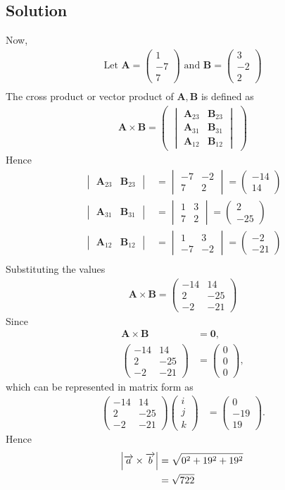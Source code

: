 \documentclass[12pt]{article}
\newcommand{\mydet}[1]{\ensuremath{\begin{vmatrix}#1\end{vmatrix}}}
\newcommand{\myvec}[1]{\ensuremath{\begin{pmatrix}#1\end{pmatrix}}}
\let\vec\mathbf
\begin{document}
\begin{enumerate}
\section{Solution}
Now,
\begin{align}
\text{Let } \vec{A} = \myvec{1\\-7\\7} \text{ and } \vec{B} = \myvec{3\\ -2 \\ 2}\\
\end{align}
The cross product or vector product of $\vec{A},\vec{B}$ is defined as
\begin{align}
	\vec{A} \times \vec{B} = \myvec{\mydet{\vec{A}_{23}&\vec{B}_{23}\\\vec{A}_{31}&\vec{B}_{31}\\\vec{A}_{12}&\vec{B}_{12}}}
\end{align}
Hence
\begin{align}
	\mydet{\vec{A}_{23}&\vec{B}_{23}}&=\mydet{-7&-2\\7&2}=\myvec{-14\\14}\\
	\mydet{\vec{A}_{31}&\vec{B}_{31}}&=\mydet{1&3\\7&2}=\myvec{2\\-25}\\
	\mydet{\vec{A}_{12}&\vec{B}_{12}}&=\mydet{1&3\\-7&-2}=\myvec{-2\\-21}\\
\end{align}
Substituting the values
\begin{align}
	\vec{A}\times\vec{B}=\myvec{-14&14\\2&-25\\-2&-21}
\end{align}
Since
\begin{align}
	\vec{A} \times \vec{B} &= \vec{0},
	\\
	\myvec{-14&14\\2&-25\\-2&-21}&=\myvec{0\\0\\0},
\end{align}
which can be represented in matrix form as
\begin{align}
	\myvec{-14&14\\2&-25\\-2&-21}\myvec{i\\j\\k}&=\myvec{0\\-19\\19}.
\end{align}
Hence
\begin{align}
\abs{\overrightarrow{a}\times \overrightarrow{b}}&=\sqrt{0^2+19^2+19^2}\\
 &= \sqrt{722}
\end{align}

\end{enumerate}
\end{document}
